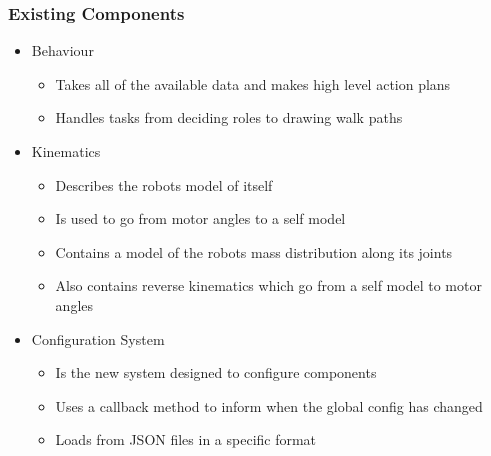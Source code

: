 \documentclass{beamer}
\begin{document}
\begin{frame}
	\frametitle{Existing Components}
	\begin{itemize}
		\item Behaviour
			\begin{itemize}
				\item Takes all of the available data and makes high level action plans
				\item Handles tasks from deciding roles to drawing walk paths
			\end{itemize}
		\item Kinematics
			\begin{itemize}
				\item Describes the robots model of itself
				\item Is used to go from motor angles to a self model
				\item Contains a model of the robots mass distribution along its joints
				\item Also contains reverse kinematics which go from a self model to motor angles
			\end{itemize}
		\item Configuration System
			\begin{itemize}
				\item Is the new system designed to configure components
				\item Uses a callback method to inform when the global config has changed
				\item Loads from JSON files in a specific format
			\end{itemize}
	\end{itemize}
\end{frame}
\end{document}
